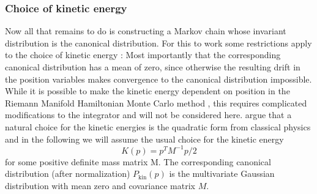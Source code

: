 \documentclass[12pt]{scrartcl}
\begin{document}
\subsubsection{Choice of kinetic energy}
Now all that remains to do is constructing a Markov chain whose invariant distribution is the canonical distribution. For this to work some restrictions apply to the choice of kinetic energy \citep{Betancourt2014}: Most importantly that the corresponding canonical distribution has a mean of zero, since otherwise the resulting drift in the position variables makes convergence to the canonical distribution impossible. While it is possible to make the kinetic energy dependent on position in the Riemann Manifold Hamiltonian Monte Carlo method \citep{Girolami2011}, this requires complicated modifications to the integrator and will not be considered here. \citep{Betancourt2014} argue that a natural choice for the kinetic energies is the quadratic form from classical physics and in the following we will assume the usual choice for the kinetic energy
\begin{equation} \label{eq:KineticEnergy}
K(p) = p^T M^{-1} p/2
\end{equation}
for some positive definite mass matrix M. The corresponding canonical distribution (after normalization) $P_\textrm{kin}(p)$ is the multivariate Gaussian distribution with mean zero and covariance matrix $M$.
\end{document}
